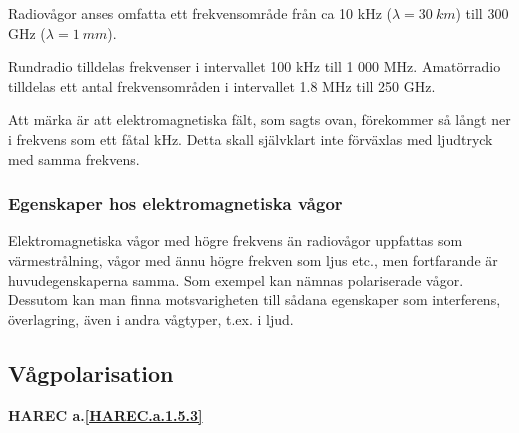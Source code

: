 Radiovågor anses omfatta ett frekvensområde från ca 10 kHz
(\(\lambda = 30\ km\)) till 300 GHz (\(\lambda = 1\ mm\)).

Rundradio tilldelas frekvenser i intervallet 100 kHz till 1 000 MHz.
Amatörradio tilldelas ett antal frekvensområden i intervallet 1.8 MHz till
250 GHz.

Att märka är att elektromagnetiska fält, som sagts ovan, förekommer så långt
ner i frekvens som ett fåtal kHz. Detta skall självklart inte förväxlas med
ljudtryck med samma frekvens.

\subsubsection{Egenskaper hos elektromagnetiska vågor}

Elektromagnetiska vågor med högre frekvens än radiovågor uppfattas som
värmestrålning, vågor med ännu högre frekven som ljus etc., men fortfarande är
huvudegenskaperna samma. Som exempel kan nämnas polariserade vågor. Dessutom
kan man finna motsvarigheten till sådana egenskaper som interferens,
överlagring, även i andra vågtyper, t.ex. i ljud.

\subsection{Vågpolarisation}
\textbf{HAREC a.\ref{HAREC.a.1.5.3}\label{myHAREC.a.1.5.3}}

